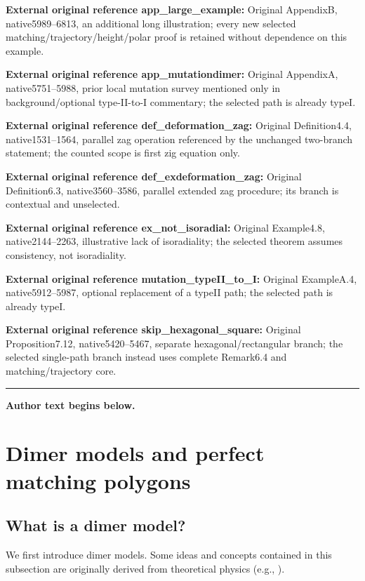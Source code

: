 \documentclass[11pt]{article}
\numberwithin{equation}{section}
\numberwithin{equation}{section}
\numberwithin{figure}{section}
\numberwithin{table}{section}
\begin{document}
\noindent\textbf{External original reference app\_large\_example:} Original AppendixB, native5989–6813, an additional long illustration; every new selected matching/trajectory/height/polar proof is retained without dependence on this example.\par
\noindent\textbf{External original reference app\_mutationdimer:} Original AppendixA, native5751–5988, prior local mutation survey mentioned only in background/optional type-II-to-I commentary; the selected path is already typeI.\par
\noindent\textbf{External original reference def\_deformation\_zag:} Original Definition4.4, native1531–1564, parallel zag operation referenced by the unchanged two-branch statement; the counted scope is first zig equation only.\par
\noindent\textbf{External original reference def\_exdeformation\_zag:} Original Definition6.3, native3560–3586, parallel extended zag procedure; its branch is contextual and unselected.\par
\noindent\textbf{External original reference ex\_not\_isoradial:} Original Example4.8, native2144–2263, illustrative lack of isoradiality; the selected theorem assumes consistency, not isoradiality.\par
\noindent\textbf{External original reference mutation\_typeII\_to\_I:} Original ExampleA.4, native5912–5987, optional replacement of a typeII path; the selected path is already typeI.\par
\noindent\textbf{External original reference skip\_hexagonal\_square:} Original Proposition7.12, native5420–5467, separate hexagonal/rectangular branch; the selected single-path branch instead uses complete Remark6.4 and matching/trajectory core.\par
\medskip\hrule\medskip\noindent\textbf{Author text begins below.}\par
\setcounter{section}{1}
\section{Dimer models and perfect matching polygons}\label{sec_pre_dimer}

\subsection{What is a dimer model?}
We first introduce dimer models. Some ideas and concepts contained in this subsection are originally derived from theoretical physics (e.g., \cite{FHK,HV}).
\end{document}
